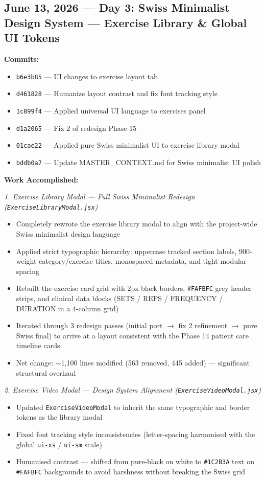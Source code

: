 \documentclass[11pt,a4paper]{article}
\begin{document}
\newpage

\subsection{June 13, 2026 — Day 3: Swiss Minimalist Design System — Exercise Library \& Global UI Tokens}

\textbf{Commits:}
\begin{itemize}
  \item \texttt{b6e3b85} — UI changes to exercise layout tab
  \item \texttt{d461828} — Humanize layout contrast and fix font tracking style
  \item \texttt{1c899f4} — Applied universal UI language to exercises panel
  \item \texttt{d1a2065} — Fix 2 of redesign Phase 15
  \item \texttt{01cae22} — Applied pure Swiss minimalist UI to exercise library modal
  \item \texttt{bddb0a7} — Update MASTER\_CONTEXT.md for Swiss minimalist UI polish
\end{itemize}

\textbf{Work Accomplished:}

\textit{1. Exercise Library Modal — Full Swiss Minimalist Redesign (\texttt{ExerciseLibraryModal.jsx})}
\begin{itemize}
  \item Completely rewrote the exercise library modal to align with the project-wide Swiss
        minimalist design language
  \item Applied strict typographic hierarchy: uppercase tracked section labels, 900-weight
        category/exercise titles, monospaced metadata, and tight modular spacing
  \item Rebuilt the exercise card grid with 2px black borders, \texttt{\#FAFBFC} grey header
        strips, and clinical data blocks (SETS / REPS / FREQUENCY / DURATION in a 4-column
        grid)
  \item Iterated through 3 redesign passes (initial port $\rightarrow$ fix 2 refinement
        $\rightarrow$ pure Swiss final) to arrive at a layout consistent with the Phase 14
        patient care timeline cards
  \item Net change: $\sim$1,100 lines modified (563 removed, 445 added) — significant
        structural overhaul
\end{itemize}

\textit{2. Exercise Video Modal — Design System Alignment (\texttt{ExerciseVideoModal.jsx})}
\begin{itemize}
  \item Updated \texttt{ExerciseVideoModal} to inherit the same typographic and border tokens
        as the library modal
  \item Fixed font tracking style inconsistencies (letter-spacing harmonised with the global
        \texttt{ui-xs} / \texttt{ui-sm} scale)
  \item Humanised contrast — shifted from pure-black on white to \texttt{\#1C2B3A} text on
        \texttt{\#FAFBFC} backgrounds to avoid harshness without breaking the Swiss grid
\end{itemize}
\end{document}
